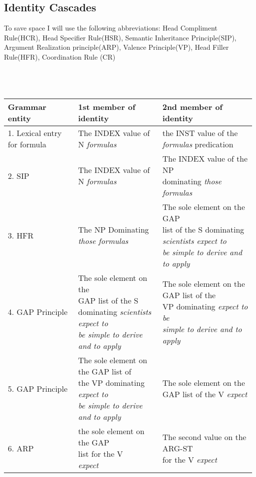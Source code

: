 \documentclass[12pt]{article}
\begin{document}
\subsection{Identity Cascades}
To save space I will use the following abbreviations:
Head Compliment Rule(HCR), Head Specifier Rule(HSR), Semantic Inheritance Principle(SIP), Argument Realization principle(ARP), Valence Principle(VP), Head Filler Rule(HFR), Coordination Rule (CR) \\
\\ \\ \\
\begin{tiny}
\begin{footnotesize}
\begin{longtable}{|l|l|l|}
\hline
Grammar entity & 1st member of identity & 2nd member of identity \\ \hline
1. Lexical entry for formula & The INDEX value of N {\it formulas}  & the INST value of the {\it formulas} predication\\ \hline
2. SIP & The INDEX value of N {\it formulas}  & \makecell{The INDEX value of the NP \\ dominating {\it those formulas}} \\ \hline
3. HFR & The NP Dominating {\it those formulas} & \makecell{The sole element on the GAP \\list of the S dominating \\{\it scientists expect to } \\{\it be simple to derive and to apply}}  \\ \hline
4. GAP Principle & \makecell{The sole element on the \\ GAP list of the S \\ dominating {\it scientists expect to} \\{\it be simple to derive and to apply}} & \makecell{The sole element on the GAP list of the \\ VP dominating {\it expect to be} \\{\it simple to derive and to apply}} \\ \hline
5. GAP Principle & \makecell{The sole element on the GAP list of \\ the VP dominating {\it expect to} \\{\it be simple to derive and to apply}}  & \makecell{ The sole element on the \\ GAP list of the V {\it expect}} \\ \hline
6. ARP & \makecell{the sole element on the GAP \\ list for the V \\{\it expect}} & \makecell{The second value on the ARG-ST\\ for the V {\it expect}} \\ \hline

\end{longtable}
\end{footnotesize}
\end{tiny}
\end{document}

